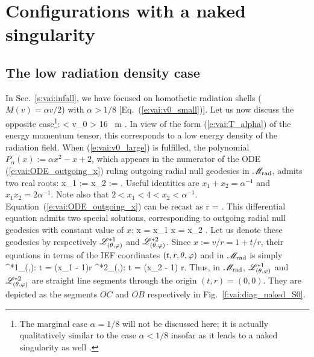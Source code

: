 \section{Configurations with a naked singularity} \label{s:vai:naked_sing}

\subsection{The low radiation density case} \label{s:vai:low_alpha}

In Sec.~\ref{s:vai:infall}, we have focused on homothetic radiation shells
($M(v) = \alpha v / 2$) with
$\alpha > 1/8$ [Eq.~(\ref{e:vai:v0_small})].
Let us now discuss the opposite case\footnote{The marginal case $\alpha = 1/8$
will not be discussed here; it is actually qualitatively similar to the
case $\alpha < 1/8$ insofar as it leads to a naked singularity as well \cite{Papap85}.}:
\be \label{e:vai:v0_large}
    \alpha <  \iff v_0 > 16 \, m .
\ee
In view of the form (\ref{e:vai:T_alpha}) of the energy momentum tensor, this
corresponds to a low energy density of the radiation field. When (\ref{e:vai:v0_large})
is fulfilled, the polynomial $P_\alpha(x) := \alpha x^2 - x + 2$, which appears in the
numerator of the ODE (\ref{e:vai:ODE_outgoing_x}) ruling outgoing radial null geodesics
in $\mathscr{M}_{\rm rad}$,
admits two real roots:
\be \label{e:vai:x1_x2}
    x_1 := 
    \qand
    x_2 :=  .
\ee
Useful identities are $x_1 + x_2 = \alpha^{-1}$ and $x_1 x_2 = 2\alpha^{-1}$.
Note also that $2 < x_1 < 4 < x_2 < \alpha^{-1}$.
Equation~(\ref{e:vai:ODE_outgoing_x}) can be recast as
\be \label{e:vai:ODE_outgoing_x_naked}
    r  =  .
\ee
This differential equation admits two special solutions, corresponding
to outgoing radial null geodesics with constant value of $x$:
\be
    x = x_1  \qand x = x_2 .
\ee
Let us denote these geodesics by respectively
$\mathscr{L}^{*1}_{(\theta,\varphi)}$ and $\mathscr{L}^{*2}_{(\theta,\varphi)}$.
Since $x := v/r = 1 + t/r$, their equations in terms of the IEF
coordinates $(t, r, \theta, \varphi)$ and in $\mathscr{M}_{\rm rad}$ is simply
\be
    \Li^{*1}_{(\th,\ph)}: \quad t = (x_1 - 1)r
    \qand
    \Li^{*2}_{(\th,\ph)}: t = (x_2 - 1) r.
\ee
Thus, in $\mathscr{M}_{\rm rad}$,
$\mathscr{L}^{*1}_{(\theta,\varphi)}$ and $\mathscr{L}^{*2}_{(\theta,\varphi)}$ are straight line segments
through the origin $(t, r) = (0,0)$. They are depicted
as the segments $OC$ and $OB$ respectively in Fig.~\ref{f:vai:diag_naked_S0}.

